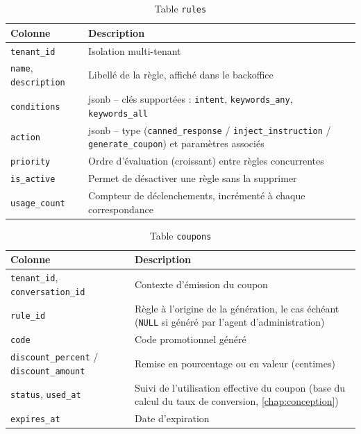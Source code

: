 \begin{table}[h]
\centering
\caption{Table \texttt{rules}}
\begin{tabular}{@{}p{4cm}p{11cm}@{}}
\toprule
\textbf{Colonne} & \textbf{Description} \\
\midrule
\texttt{tenant\_id} & Isolation multi-tenant \\
\texttt{name}, \texttt{description} & Libellé de la règle, affiché dans le backoffice \\
\texttt{conditions} & \gls{jsonb} -- clés supportées : \texttt{intent}, \texttt{keywords\_any}, \texttt{keywords\_all} \\
\texttt{action} & \gls{jsonb} -- type (\texttt{canned\_response} / \texttt{inject\_instruction} / \texttt{generate\_coupon}) et paramètres associés \\
\texttt{priority} & Ordre d'évaluation (croissant) entre règles concurrentes \\
\texttt{is\_active} & Permet de désactiver une règle sans la supprimer \\
\texttt{usage\_count} & Compteur de déclenchements, incrémenté à chaque correspondance \\
\bottomrule
\end{tabular}
\end{table}

\begin{table}[h]
\centering
\caption{Table \texttt{coupons}}
\begin{tabular}{@{}p{4cm}p{11cm}@{}}
\toprule
\textbf{Colonne} & \textbf{Description} \\
\midrule
\texttt{tenant\_id}, \texttt{conversation\_id} & Contexte d'émission du coupon \\
\texttt{rule\_id} & Règle à l'origine de la génération, le cas échéant (\texttt{NULL} si généré par l'agent d'administration) \\
\texttt{code} & Code promotionnel généré \\
\texttt{discount\_percent} / \texttt{discount\_amount} & Remise en pourcentage ou en valeur (centimes) \\
\texttt{status}, \texttt{used\_at} & Suivi de l'utilisation effective du coupon (base du calcul du taux de conversion, \cref{chap:conception}) \\
\texttt{expires\_at} & Date d'expiration \\
\bottomrule
\end{tabular}
\end{table}

